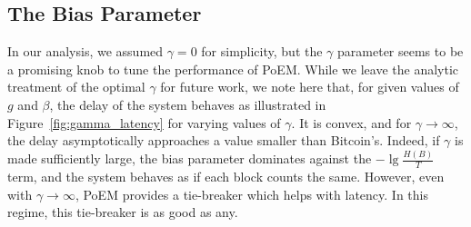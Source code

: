 \subsection{The Bias Parameter}

In our analysis, we assumed $\gamma = 0$ for simplicity, but the $\gamma$ parameter
seems to be a promising knob to tune the performance of PoEM. While we leave
the
analytic treatment of the optimal $\gamma$ for future work, we note here that,
for given values of $g$ and $\beta$, the delay of the system behaves as illustrated
in Figure~\ref{fig:gamma_latency} for varying values of $\gamma$. It is convex, and for $\gamma \to \infty$,
the delay asymptotically approaches a value smaller than Bitcoin's. Indeed, if $\gamma$ is made sufficiently large, the bias
parameter dominates against the $-\lg\frac{H(B)}{T}$ term, and the system behaves
as if each block counts the same. However, even with $\gamma \to \infty$, PoEM provides a tie-breaker
which helps with latency. In this regime, this tie-breaker is as good as any.

